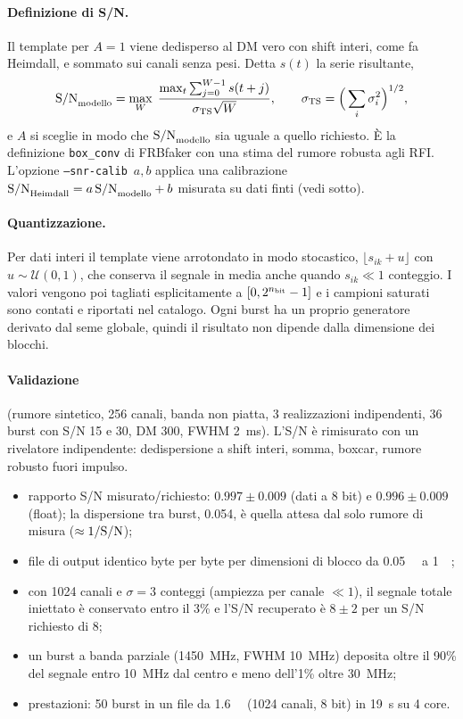 \documentclass[11pt,a4paper]{article}
\begin{document}
\paragraph{Definizione di S/N.} Il template per $A=1$ viene dedisperso al DM vero con shift interi, come fa
Heimdall, e sommato sui canali senza pesi. Detta $s(t)$ la serie risultante,
\begin{equation}
  {\rm S/N}_{\rm modello}=\max_{W}\;\frac{\max_t \sum_{j=0}^{W-1}s(t+j)}{\sigma_{\rm TS}\sqrt{W}},
  \qquad \sigma_{\rm TS}=\Big(\sum_i\sigma_i^2\Big)^{1/2},
\end{equation}
e $A$ si sceglie in modo che ${\rm S/N}_{\rm modello}$ sia uguale a quello richiesto. È la definizione
\texttt{box\_conv} di FRBfaker con una stima del rumore robusta agli RFI. L'opzione
\texttt{--snr-calib}~$a,b$ applica una calibrazione ${\rm S/N}_{\rm Heimdall}=a\,{\rm S/N}_{\rm modello}+b$
misurata su dati finti (vedi sotto).

\paragraph{Quantizzazione.} Per dati interi il template viene arrotondato in modo stocastico,
$\lfloor s_{ik}+u\rfloor$ con $u\sim\mathcal U(0,1)$, che conserva il segnale in media anche quando
$s_{ik}\ll1$ conteggio. I valori vengono poi tagliati esplicitamente a $[0,2^{n_{\rm bit}}-1]$ e i campioni
saturati sono contati e riportati nel catalogo. Ogni burst ha un proprio generatore derivato dal seme globale,
quindi il risultato non dipende dalla dimensione dei blocchi.

\paragraph{Validazione} (rumore sintetico, 256 canali, banda non piatta, 3 realizzazioni indipendenti, 36 burst
con S/N 15 e 30, DM 300, FWHM \SI{2}{\milli\second}). L'S/N è rimisurato con un rivelatore indipendente:
dedispersione a shift interi, somma, boxcar, rumore robusto fuori impulso.
\begin{itemize}
  \item rapporto S/N misurato/richiesto: $0.997\pm0.009$ (dati a 8 bit) e $0.996\pm0.009$ (float); la dispersione
    tra burst, 0.054, è quella attesa dal solo rumore di misura ($\approx1/{\rm S/N}$);
  \item file di output identico byte per byte per dimensioni di blocco da \SI{0.05}{\mega\byte} a \SI{1}{\giga\byte};
  \item con \num{1024} canali e $\sigma=3$ conteggi (ampiezza per canale $\ll1$), il segnale totale iniettato è
    conservato entro il 3\% e l'S/N recuperato è $8\pm2$ per un S/N richiesto di 8;
  \item un burst a banda parziale (\SI{1450}{\mega\hertz}, FWHM \SI{10}{\mega\hertz}) deposita oltre il 90\% del
    segnale entro \SI{10}{\mega\hertz} dal centro e meno dell'1\% oltre \SI{30}{\mega\hertz};
  \item prestazioni: 50 burst in un file da \SI{1.6}{\giga\byte} (1024 canali, 8 bit) in \SI{19}{\second} su 4 core.
\end{itemize}
\end{document}
